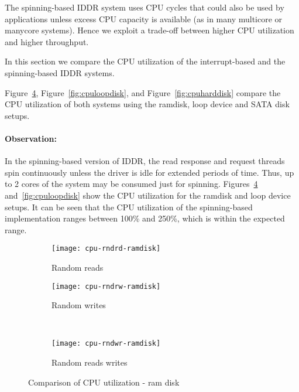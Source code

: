 The spinning-based IDDR system uses CPU cycles that could also be
used by applications unless excess CPU capacity is available (as in many
multicore or manycore systems).
Hence we exploit a trade-off between higher CPU utilization and 
higher throughput.

In this section we compare the CPU utilization of the interrupt-based and
the spinning-based IDDR systems.

Figure~\ref{fig:cpuramdisk}, Figure~\ref{fig:cpuloopdisk}, and
Figure~\ref{fig:cpuharddisk} compare the CPU utilization of both 
systems using the ramdisk, loop device and SATA disk setups.

\paragraph{Observation: }
In the spinning-based version of IDDR, the read response and request threads
spin continuously unless the driver is idle for extended periods of time.
Thus, up to 2 cores of the system may be consumed just for spinning.
Figures~\ref{fig:cpuramdisk} and~\ref{fig:cpuloopdisk} show the CPU
utilization for the ramdisk and loop device setups.
It can be seen that the CPU utilization of the spinning-based 
implementation ranges between 100\% and 250\%, which is within the
expected range.

\begin{figure}[!ht]
  \begin{subfigure}[b]{0.2\textwidth}
  \texttt{[image: cpu-rndrd-ramdisk]}
  \caption{Random reads}
  \label{subfig:cpu-rndrd-ramdisk}
  \end{subfigure}
  \hspace{50mm}
  \begin{subfigure}[b]{0.2\textwidth}
  \texttt{[image: cpu-rndrw-ramdisk]}
  \caption{Random writes}
  \label{subfig:cpu-rndrw-ramdisk}
  \end{subfigure}\\
  \begin{subfigure}[b]{0.3\textwidth}
  \texttt{[image: cpu-rndwr-ramdisk]}
  \caption{Random reads writes}
  \label{subfig:cpu-rndwr-ramdisk}
  \end{subfigure}
\caption{Comparison of CPU utilization - ram disk}\label{fig:cpuramdisk}
\end{figure}

